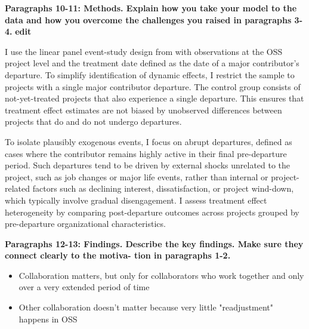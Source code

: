 \documentclass[12pt,notitlepage]{article}
\begin{document}
\textbf{Paragraphs 10-11: Methods. Explain how you take your model to the data and how you overcome the
challenges you raised in paragraphs 3-4.}
\textbf{edit}

I use the linear panel event-study design from \cite{freyaldenhoven_visualization_2021} with observations at the OSS project level and the treatment date defined as the date of a major contributor's departure. To simplify identification of dynamic effects, I restrict the sample to projects with a single major contributor departure. The control group consists of not-yet-treated projects that also experience a single departure. This ensures that treatment effect estimates are not biased by unobserved differences between projects that do and do not undergo departures.

To isolate plausibly exogenous events, I focus on abrupt departures, defined as cases where the contributor remains highly active in their final pre-departure period. Such departures tend to be driven by external shocks unrelated to the project, such as job changes or major life events, rather than internal or project-related factors such as declining interest, dissatisfaction, or project wind-down, which typically involve gradual disengagement. I assess treatment effect heterogeneity by comparing post-departure outcomes across projects grouped by pre-departure organizational characteristics.

\iffalse
\textcolor{red}{Ideally, I'd like to be able to just compare projects who experienced departures in similar timeframes but I don't know any methods that allow you to do this and still enable you to examine long-term effects without adding restrictions. Perhaps I can add this as a robustness check?. }

Quotes from Miller 2019
 One such blog post describes how “as [my project’s] pop-
ularity rose and rose, my drive to continue to create new projects, fell. All while the
burden of supporting the needs of the massive user bases of my successful projects and
the pressure of maintaining those projects grew.”1

Also, Miller 2019 use abrupt engagement and finds different results from other papers
\fi

\textbf{Paragraphs 12-13: Findings. Describe the key findings. Make sure they connect clearly to the motiva-
tion in paragraphs 1-2.}
\begin{itemize}
    \item Collaboration matters, but only for collaborators who work together and only over a very extended period of time
    \item Other collaboration doesn't matter because very little "readjustment" happens in OSS
\end{itemize}
\end{document}
